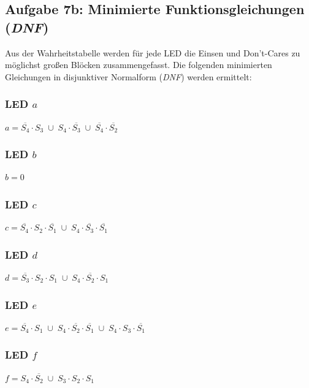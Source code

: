 \subsection{Aufgabe 7b: Minimierte Funktionsgleichungen (\textit{\acs{DNF}})}
Aus der Wahrheitstabelle werden für jede \acs{LED} die Einsen und Don't-Cares zu möglichst großen Blöcken zusammengefasst.  
Die folgenden minimierten Gleichungen in disjunktiver Normalform (\textit{\acs{DNF}}) werden ermittelt:
\subsubsection{\texorpdfstring{\acs{LED} \(a\)}{LED a}} \hspace{4cm} \(\boxed{a = \overline{S_4} \cdot S_3 \;\cup\; S_4 \cdot \overline{S_3} \;\cup\; \overline{S_4} \cdot \overline{S_2}}\)
\subsubsection{\texorpdfstring{\acs{LED} \(b\)}{LED b}} \hspace{4cm} \(\boxed{b = 0}\)
\subsubsection{\texorpdfstring{\acs{LED} \(c\)}{LED c}} \hspace{4cm} \(\boxed{c = \overline{S_4} \cdot S_2 \cdot \overline{S_1} \;\cup\; S_4 \cdot \overline{S_3} \cdot \overline{S_1}}\)
\subsubsection{\texorpdfstring{\acs{LED} \(d\)}{LED d}} \hspace{4cm} \(\boxed{d = \overline{S_3} \cdot S_2 \cdot S_1 \;\cup\; S_4 \cdot \overline{S_2} \cdot S_1}\)
\subsubsection{\texorpdfstring{\acs{LED} \(e\)}{LED e}} \hspace{4cm} \(\boxed{e = \overline{S_4} \cdot S_1 \;\cup\; S_4 \cdot \overline{S_2} \cdot \overline{S_1} \;\cup\; S_4 \cdot S_3 \cdot \overline{S_1}}\)
\subsubsection{\texorpdfstring{\acs{LED} \(f\)}{LED f}} \hspace{4cm} \(\boxed{f = S_4 \cdot \overline{S_2} \;\cup\; S_3 \cdot S_2 \cdot S_1}\)
